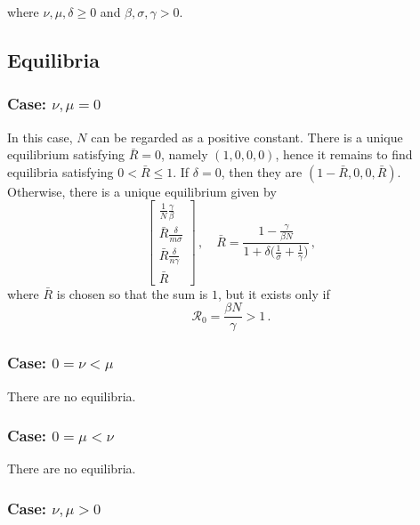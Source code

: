 \documentclass[fleqn]{article}
\begin{document}
where $\nu,\mu,\delta \geq 0$ and $\beta,\sigma,\gamma > 0$.

\subsection{Equilibria}

\subsubsection{Case: $\nu, \mu = 0$}

In this case, $N$ can be regarded as a positive constant.  There is a
unique equilibrium satisfying $\bar{R} = 0$, namely $(1, 0, 0, 0)$,
hence it remains to find equilibria satisfying $0 < \bar{R} \leq 1$.
If $\delta = 0$, then they are $(1 - \bar{R}, 0, 0, \bar{R})$.
Otherwise, there is a unique equilibrium given by
\begin{equation}
\begin{bmatrix}
  \frac{1}{N} \frac{\gamma}{\beta} \\
  \bar{R} \frac{\delta}{m \sigma} \\
  \bar{R} \frac{\delta}{n \gamma} \\
  \bar{R}
\end{bmatrix}
\,,\quad
\bar{R} = \frac{1 - \frac{\gamma}{\beta N}}{1 + \delta \big(\frac{1}{\sigma} + \frac{1}{\gamma}\big)}\,,
\end{equation}
where $\bar{R}$ is chosen so that the sum is $1$, but it exists only if
\begin{equation}
\mathcal{R}_{0} = \frac{\beta N}{\gamma} > 1\,.
\end{equation}

\subsubsection{Case: $0 = \nu < \mu$}

There are no equilibria.

\subsubsection{Case: $0 = \mu < \nu$}

There are no equilibria.

\subsubsection{Case: $\nu, \mu > 0$}
\end{document}
